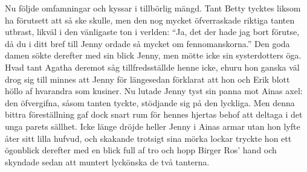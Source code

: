 Nu följde omfamningar och kyssar i tillbörlig mängd. Tant Betty tycktes
liksom ha förutsett att så ske skulle, men den nog mycket öfverraskade
riktiga tanten utbrast, likväl i den vänligaste ton i verlden: ``Ja, det
der hade jag bort förutse, då du i ditt bref till Jenny ordade så mycket
om fennomanskorna.'' Den goda damen sökte derefter med sin blick Jenny,
men mötte icke sin systerdotters öga. Hvad tant Agatha deremot såg
tillfredsställde henne icke, ehuru hon ganska väl drog sig till minnes
att Jenny för längesedan förklarat att hon och Erik blott höllo af
hvarandra som kusiner. Nu lutade Jenny tyst sin panna mot Ainas axel:
den öfvergifna, såsom tanten tyckte, stödjande sig på den lyckliga. Men
denna bittra föreställning gaf dock snart rum för hennes hjertas behof
att deltaga i det unga parets sällhet. Icke länge dröjde heller Jenny i
Ainas armar utan hon lyfte åter sitt lilla hufvud, och skakande trotsigt
sina mörka lockar tryckte hon ett ögonblick derefter med en blick full
af tro och hopp Birger Ros' hand och skyndade sedan att muntert
lyckönska de två tanterna.

